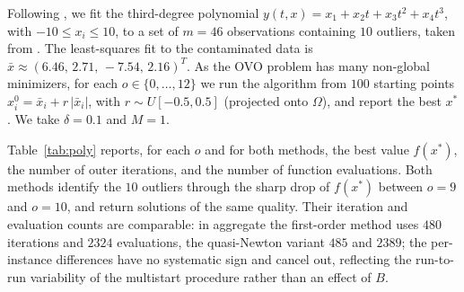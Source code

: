 \documentclass[11pt]{article}
\begin{document}
Following \cite{dunder1}, we fit the third-degree polynomial
$y(t,x)=x_1+x_2t+x_3t^2+x_4t^3$, with $-10\le x_i\le10$, to a set of $m=46$
observations containing $10$ outliers, taken from \cite{dunder1}. The
least-squares fit to the contaminated data is
$\bar x\approx(6.46,\,2.71,\,-7.54,\,2.16)^T$. As the OVO problem has many
non-global minimizers, for each $o\in\{0,\dots,12\}$ we run the algorithm from
$100$ starting points $x^0_i=\bar x_i+r\,|\bar x_i|$, with $r\sim U[-0.5,0.5]$
(projected onto $\Omega$), and report the best $x^*$. We take $\delta=0.1$ and
$M=1$.

Table~\ref{tab:poly} reports, for each $o$ and for both methods, the best value
$f(x^*)$, the number of outer iterations, and the number of function
evaluations. Both methods identify the $10$ outliers through the sharp drop of
$f(x^*)$ between $o=9$ and $o=10$, and return solutions of the same quality.
Their iteration and evaluation counts are comparable: in aggregate the
first-order method uses $480$ iterations and $2324$ evaluations, the
quasi-Newton variant $485$ and $2389$; the per-instance differences have no
systematic sign and cancel out, reflecting the run-to-run variability of the
multistart procedure rather than an effect of $B$.
\end{document}
